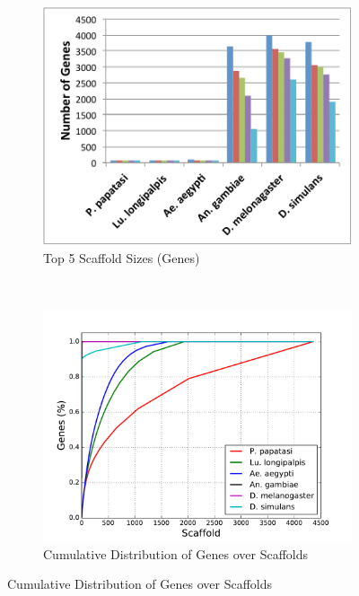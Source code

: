 \begin{figure}[H]
\begin{subfigure}[b]{0.45\textwidth}
    \includegraphics[width=\textwidth]{figures/synteny/top5_scaffold_sizes.pdf}
    \caption{Top 5 Scaffold Sizes (Genes)}
    \label{fig:largest-scaffolds}
  \end{subfigure}
  ~
  \begin{subfigure}[b]{0.45\textwidth}
    \includegraphics[width=\textwidth]{figures/synteny/gene_scaffold_cdf.pdf}
    \caption{Cumulative Distribution of Genes over Scaffolds}
    \label{fig:gene-scaffold-cdf}
  \end{subfigure}
  \label{fig:scaffolds}
\end{figure}


